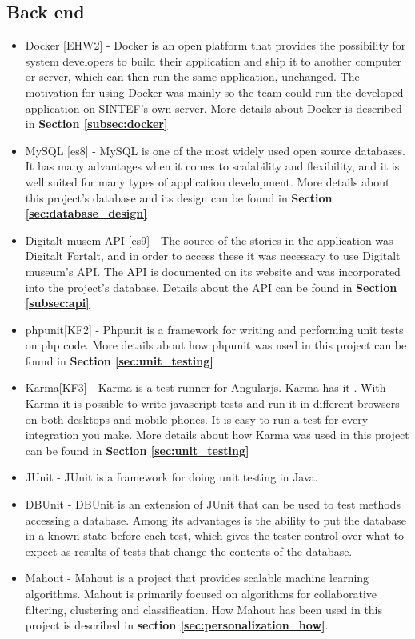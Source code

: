 \subsection{Back end}
\begin{itemize}
	\item Docker [EHW2] - Docker is an open platform that provides the possibility for system developers to build their application and ship it to another computer or server, which can then run the same application, unchanged. The motivation for using Docker was mainly so the team could run the developed application on SINTEF’s own server. More details about Docker is described in \textbf{Section \ref{subsec:docker}}
	\item MySQL [es8] - MySQL is one of the most widely used open source databases. It has many advantages when it comes to scalability and flexibility, and it is well suited for many types of application development. More details about this project’s database and its design can be found in \textbf{Section \ref{sec:database_design}}
	\item Digitalt musem API [es9] - The source of the stories in the application was Digitalt Fortalt, and in order to access these it was necessary to use Digitalt museum’s API. The API is documented on its website and was incorporated into the project’s database. Details about the API can be found in \textbf{Section \ref{subsec:api}}
	\item phpunit[KF2] - Phpunit is a framework for writing and performing unit tests on php code. More details about how phpunit was used in this project can be found in \textbf{Section \ref{sec:unit_testing}}
	\item Karma[KF3] - Karma is a test runner for Angularjs. Karma has it . With Karma it is possible to write javascript tests and run it in different browsers on both desktops and mobile phones. It is easy to run a test for every integration you make. More details about how Karma was used in this project can be found in \textbf{Section \ref{sec:unit_testing}}
	\item JUnit \cite{as7} - JUnit is a framework for doing unit testing in Java. 
	\item DBUnit \cite{as8} - DBUnit is an extension of JUnit that can be used to test methods accessing a database. Among its advantages is the ability to put the database in a known state before each test, which gives the tester control over what to expect as results of tests that change the contents of the database.
	\item Mahout \cite{as9} - Mahout is a project that provides scalable machine learning algorithms. Mahout is primarily focused on algorithms for collaborative filtering, clustering and classification. How Mahout has been used in this project is described in \textbf{section \ref{sec:personalization_how}}.
\end{itemize}


